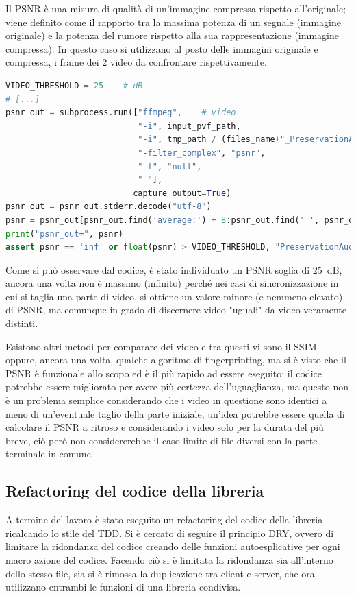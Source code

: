 Il \ac{PSNR} è una misura di qualità di un'immagine compressa rispetto all'originale; viene definito come il rapporto tra la massima potenza di un segnale (immagine originale) e la potenza del rumore rispetto alla sua rappresentazione (immagine compressa).
In questo caso si utilizzano al posto delle immagini originale e compressa, i frame dei 2 video da confrontare rispettivamente.

\begin{lstlisting}[language=Python, caption=Test di comparazione di due file audio tramite il psnr]
VIDEO_THRESHOLD = 25    # dB
# [...]
psnr_out = subprocess.run(["ffmpeg",    # video
                           "-i", input_pvf_path,
                           "-i", tmp_path / (files_name+"_PreservationAudioVisualFile_output_video.mov"),
                           "-filter_complex", "psnr",
                           "-f", "null",
                           "-"],
                          capture_output=True)
psnr_out = psnr_out.stderr.decode("utf-8")
psnr = psnr_out[psnr_out.find('average:') + 8:psnr_out.find(' ', psnr_out.find('average:'))]
print("psnr_out=", psnr)
assert psnr == 'inf' or float(psnr) > VIDEO_THRESHOLD, "PreservationAudioVisualFile.mov is not the same as input"
\end{lstlisting}

Come si può osservare dal codice, è stato individuato un \ac{PSNR} soglia di \qty{25}{\dB}, ancora una volta non è massimo (infinito) perché nei casi di sincronizzazione in cui si taglia una parte di video, si ottiene un valore minore (e nemmeno elevato) di \ac{PSNR}, ma comunque in grado di discernere video "uguali" da video veramente distinti.

Esistono altri metodi per comparare dei video e tra questi vi sono il \ac{SSIM} oppure, ancora una volta, qualche algoritmo di fingerprinting, ma si è visto che il \ac{PSNR} è funzionale allo scopo ed è il più rapido ad essere eseguito; il codice potrebbe essere migliorato per avere più certezza dell'uguaglianza, ma questo non è un problema semplice considerando che i video in questione sono identici a meno di un'eventuale taglio della parte iniziale, un'idea potrebbe essere quella di calcolare il \ac{PSNR} a ritroso e considerando i video solo per la durata del più breve, ciò però non considererebbe il caso limite di file diversi con la parte terminale in comune.


\subsection{Refactoring del codice della libreria} \label{ssec:packager-post}  %
A termine del lavoro è stato eseguito un refactoring del codice della libreria ricalcando lo stile del \ac{TDD}.
Si è cercato di seguire il principio \ac{DRY}, ovvero di limitare la ridondanza del codice creando delle funzioni autoesplicative per ogni macro azione del codice.
Facendo ciò si è limitata la ridondanza sia all'interno dello stesso file, sia si è rimossa la duplicazione tra client e server, che ora utilizzano entrambi le funzioni di una libreria condivisa.

